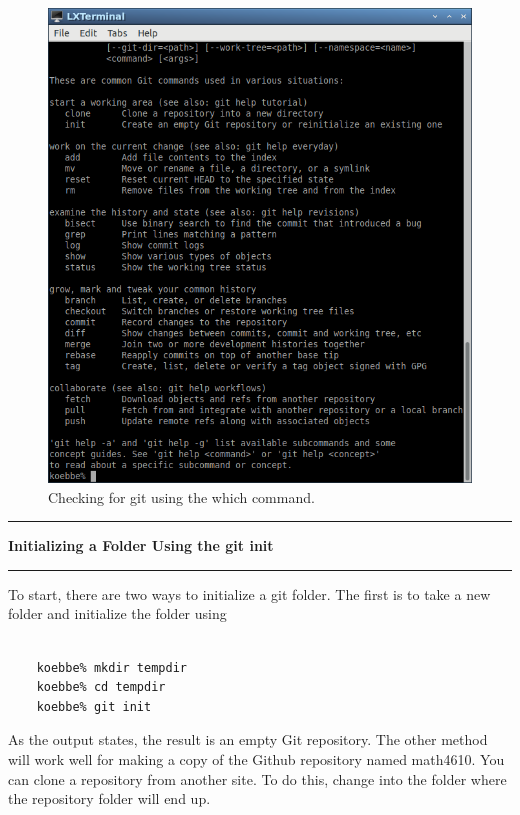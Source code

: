 \documentclass[10pt,fleqn]{article}
\begin{document}
\begin{figure}[h]
\centering
\includegraphics{../images/git_03.png}
\vskip0.1in
\caption{Checking for git using the which command.}
\end{figure}
\eject
\vskip0.1in\hrule\vskip0.1in\noindent
{\bf Initializing a Folder Using the git init} 
\vskip0.1in\hrule\vskip0.1in\noindent
To start, there are two ways to initialize a git folder. The first is to take
a new folder and initialize the folder using
\begin{verbatim}

    koebbe% mkdir tempdir
    koebbe% cd tempdir
    koebbe% git init

\end{verbatim}
As the output states, the result is an empty Git repository. The other method
will work well for making a copy of the Github repository named math4610. You
can clone a repository from another site. To do this, change into the folder
where the repository folder will end up.
\vfill
\end{document}
